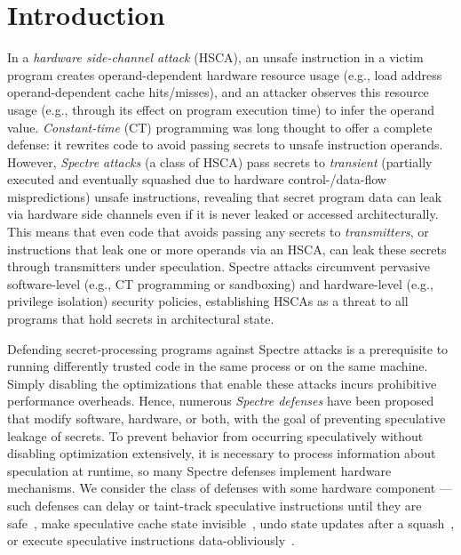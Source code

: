 \section{Introduction}
In a \textit{hardware side-channel attack} (HSCA), an unsafe instruction in a victim program creates operand-dependent hardware resource usage (e.g., load address operand-dependent cache hits/misses), and an attacker observes this resource usage (e.g., through its effect on program execution time) to infer the operand value. \textit{Constant-time} (CT) programming was long thought to offer a complete defense: it rewrites code to avoid passing secrets to unsafe instruction operands. However, \textit{Spectre attacks}\cite{spectre} (a class of HSCA) pass secrets to \textit{transient} (partially executed and eventually squashed due to hardware control-/data-flow mispredictions) unsafe instructions, revealing that secret program data can leak via hardware side channels even if it is never leaked or accessed architecturally. This means that even code that avoids passing any secrets to \textit{transmitters}, or instructions that leak one or more operands via an HSCA, can leak these secrets through transmitters under speculation. Spectre attacks circumvent pervasive software-level (e.g., CT programming or sandboxing) and hardware-level (e.g., privilege isolation) security policies, establishing HSCAs as a threat to all programs that hold secrets in architectural state.

Defending secret-processing programs against Spectre attacks is a prerequisite to running differently trusted code in the same process or on the same machine. Simply disabling the optimizations that enable these attacks incurs prohibitive performance overheads. Hence, numerous \textit{Spectre defenses} have been proposed that modify software, hardware, or both, with the goal of preventing speculative leakage of secrets. To prevent behavior from occurring speculatively without disabling optimization extensively, it is necessary to process information about speculation at runtime, so many Spectre defenses implement hardware mechanisms. We consider the class of defenses with some hardware component — such defenses can delay or taint-track speculative instructions until they are safe~\cite{yu2019stt,spt,nda,specshield,loughlin2021dolma,sakalis2019delay,recon,doppelganger,protean,cheng2024speclfb}, make speculative cache state invisible~\cite{yan2018invisispec,khasawneh2019safespec,ainsworth2020muontrap,ainsworth2021ghostminion}, undo state updates after a squash~\cite{saileshwar2019cleanupspec}, or execute speculative instructions data-obliviously~\cite{sdo}.

